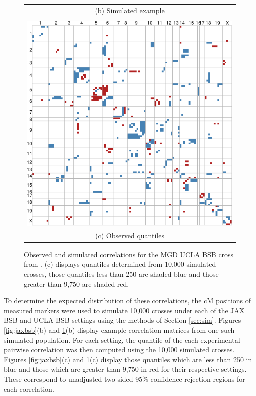 \documentclass[sts]{imsart}
\begin{document}
\begin{figure}[h!]
\begin{center}
\begin{tabular}{c}
      {\footnotesize (b) Simulated example} \\
      \\
      \includegraphics[scale = 0.3]{../img/uclabsb_quant.png} \\
      {\footnotesize (c) Observed quantiles} 
    \end{tabular}
  \end{center}
  \caption{Observed and simulated correlations for the \href{http://www.informatics.jax.org/downloads/reports/MGI_UCLA_BSB_Panel.rpt}{MGD UCLA BSB cross} from \cite{welchetal1996uclabsb}. (c) displays quantiles determined from 10,000 simulated crosses, those quantiles less than 250 are shaded blue and those greater than 9,750 are shaded red.}
  \label{fig:uclabsb}
\end{figure}

To determine the expected distribution of these correlations, the cM positions of measured markers were used to simulate 10,000 crosses under each of the JAX BSB and UCLA BSB settings using the methods of Section \ref{sec:sim}. Figures \ref{fig:jaxbsb}(b) and \ref{fig:uclabsb}(b) display example correlation matrices from one such simulated population. For each setting, the quantile of the each experimental pairwise correlation was then computed using the 10,000 simulated crosses. Figures \ref{fig:jaxbsb}(c) and \ref{fig:uclabsb}(c) display those quantiles which are less than 250 in blue and those which are greater than 9,750 in red for their respective settings. These correspond to unadjusted two-sided 95\% confidence rejection regions for each correlation.
\end{document}
